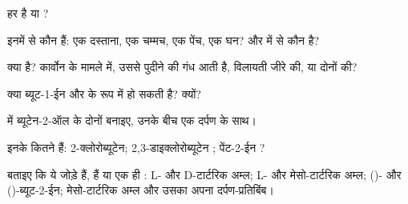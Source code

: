 \begin{exercise}[$\star$]\label{exo:g12:stereochemistry:2}
हर   है या ?
\begin{center}
 \qquad
{}
\end{center}
\end{exercise}

\begin{exercise}[$\star$]\label{exo:g12:stereochemistry:3}
इनमें से कौन  हैं: एक दस्ताना, एक चम्मच, एक पेंच, एक घन? 
 और  में से कौन  है?
\end{exercise}

\begin{exercise}[$\star$]\label{exo:g12:stereochemistry:4}
 क्या है? कार्वोन के मामले में, उससे पुदीने की गंध आती है, विलायती जीरे की,
या दोनों की?
\end{exercise}

\begin{exercise}[$\star$]\label{exo:g12:stereochemistry:5}
क्या ब्यूट-1-ईन   और  के रूप में हो सकती है? क्यों?
\end{exercise}

\begin{exercise}[$\star\star$]\label{exo:g12:stereochemistry:6}
 में ब्यूटेन-2-ऑल के दोनों  बनाइए, उनके
बीच एक दर्पण के साथ।
\end{exercise}

\begin{exercise}[$\star\star$]\label{exo:g12:stereochemistry:7}
इनके कितने  हैं: 2-क्लोरोब्यूटेन;
2,3-डाइक्लोरोब्यूटेन ; पेंट-2-ईन
?
\end{exercise}

\begin{exercise}[$\star\star$]\label{exo:g12:stereochemistry:8}
बताइए कि ये जोड़े  हैं,  हैं या एक ही
: L- और D-टार्टरिक अम्ल; L- और मेसो-टार्टरिक अम्ल; ()- और
()-ब्यूट-2-ईन; मेसो-टार्टरिक अम्ल और उसका अपना दर्पण-प्रतिबिंब।
\end{exercise}


